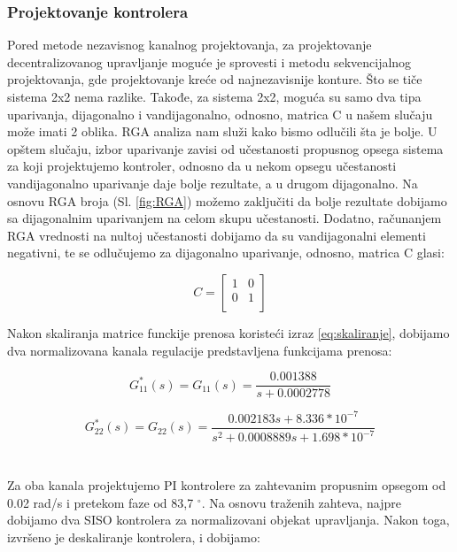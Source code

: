 \documentclass[a4paper,11pt]{article}
\theoremstyle{definition} \newtheorem{deff}{Definicija}[section]
\theoremstyle{definition} \newtheorem{prim}[deff]{Primer}
\theoremstyle{plain} \newtheorem{teor}[deff]{Teorema}
\begin{document}
	
	\newpage
	\subsubsection{Projektovanje kontrolera}
	
	Pored metode nezavisnog kanalnog projektovanja, za projektovanje decentralizovanog upravljanje moguće je sprovesti i metodu sekvencijalnog projektovanja, gde projektovanje kreće od najnezavisnije konture. Što se tiče sistema 2x2 nema razlike. Takođe, za sistema 2x2, moguća su samo dva tipa uparivanja, dijagonalno i vandijagonalno, odnosno, matrica C u našem slučaju može imati 2 oblika. RGA analiza nam služi kako bismo odlučili šta je bolje. U opštem slučaju, izbor uparivanje zavisi od učestanosti propusnog opsega sistema za koji projektujemo kontroler, odnosno da u nekom opsegu učestanosti vandijagonalno uparivanje daje bolje rezultate, a u drugom dijagonalno. Na osnovu RGA broja (Sl. \ref{fig:RGA}) možemo zaključiti da bolje rezultate dobijamo sa dijagonalnim uparivanjem na celom skupu učestanosti. Dodatno, računanjem RGA vrednosti na nultoj učestanosti dobijamo da su vandijagonalni elementi negativni, te se odlučujemo za dijagonalno uparivanje, odnosno, matrica C glasi:
	
	\begin{equation}
		C = \begin{bmatrix}
			1 & 0 \\
			0 & 1 \\
		\end{bmatrix}
	\end{equation}
	
	Nakon skaliranja matrice funckije prenosa koristeći izraz \eqref{eq:skaliranje}, dobijamo dva normalizovana kanala regulacije predstavljena funkcijama prenosa:
	
	\begin{equation}
		G^*_{11}(s) = G_{11}(s) = \frac{0.001388}{{ s + 0.0002778}}
	\end{equation}
	
	\begin{equation}
		G^*_{22}(s) = G_{22}(s) = \frac{0.002183 s + 8.336*10^{-7}}{{  s^2 + 0.0008889 s + 1.698*10^{-7}}}
	\end{equation}
	\\\\
	Za oba kanala projektujemo PI kontrolere za zahtevanim propusnim opsegom od 0.02 rad/s i pretekom faze od 83,7 $^{\circ}$. Na osnovu traženih zahteva, najpre dobijamo dva SISO kontrolera za normalizovani objekat upravljanja. Nakon toga, izvršeno je deskaliranje kontrolera, i dobijamo: 
	
\end{document}
